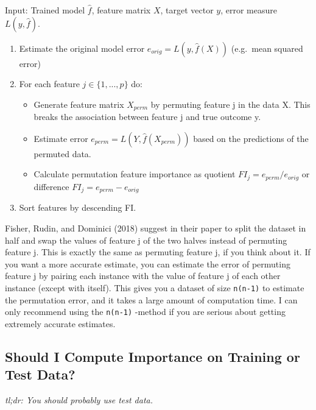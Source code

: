 \documentclass[
  11pt,
]{scrbook}
\providecommand{\tightlist}{%
  \setlength{\itemsep}{0pt}\setlength{\parskip}{0pt}}
\begin{document}
Input: Trained model \(\hat{f}\), feature matrix \(X\), target vector \(y\), error measure \(L(y,\hat{f})\).

\begin{enumerate}
\def\labelenumi{\arabic{enumi}.}
\tightlist
\item
  Estimate the original model error \(e_{orig} = L(y, \hat{f}(X))\) (e.g.~mean squared error)
\item
  For each feature \(j \in \{1,...,p\}\) do:

  \begin{itemize}
  \tightlist
  \item
    Generate feature matrix \(X_{perm}\) by permuting feature j in the data X. This breaks the association between feature j and true outcome y.
  \item
    Estimate error \(e_{perm} = L(Y,\hat{f}(X_{perm}))\) based on the predictions of the permuted data.
  \item
    Calculate permutation feature importance as quotient \(FI_j= e_{perm}/e_{orig}\) or difference \(FI_j = e_{perm}- e_{orig}\)
  \end{itemize}
\item
  Sort features by descending FI.
\end{enumerate}

Fisher, Rudin, and Dominici (2018) suggest in their paper to split the dataset in half and swap the values of feature j of the two halves instead of permuting feature j.
This is exactly the same as permuting feature j, if you think about it.
If you want a more accurate estimate, you can estimate the error of permuting feature j by pairing each instance with the value of feature j of each other instance (except with itself).
This gives you a dataset of size \texttt{n(n-1)} to estimate the permutation error, and it takes a large amount of computation time.
I can only recommend using the \texttt{n(n-1)} -method if you are serious about getting extremely accurate estimates.

\hypertarget{feature-importance-data}{%
\subsection{Should I Compute Importance on Training or Test Data?}\label{feature-importance-data}}

\emph{tl;dr: You should probably use test data.}
\end{document}
